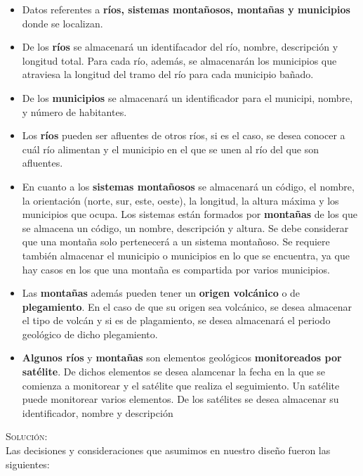 \documentclass[letterpaper,11pt]{article}
\begin{document}
\begin{itemize}
    \begin{itemize}
        \item Datos referentes a \textbf{ríos, sistemas montañosos, montañas y
              municipios} donde se localizan.
        \item De los \textbf{ríos} se almacenará un identifacador del río, nombre,
              descripción y longitud total. Para cada río, además, se almacenarán
              los municipios que atraviesa la longitud del tramo del río para cada
              municipio bañado.
        \item De los \textbf{municipios} se almacenará un identificador para
              el municipi, nombre, y número de habitantes.
        \item Los \textbf{ríos} pueden ser afluentes de otros ríos, si es el caso,
              se desea conocer a cuál río alimentan y el municipio en el que se unen
              al río del que son afluentes.
        \item En cuanto a los \textbf{sistemas montañosos} se almacenará un código,
              el nombre, la orientación (norte, sur, este, oeste), la longitud, la
              altura máxima y los municipios que ocupa. Los sistemas están formados
              por \textbf{montañas} de los que se almacena un código, un nombre,
              descripción y altura. Se debe considerar que una montaña solo
              pertenecerá a un sistema montañoso. Se requiere también almacenar
              el municipio o municipios en lo que se encuentra, ya que hay casos
              en los que una montaña es compartida por varios municipios.
        \item Las \textbf{montañas} además pueden tener un \textbf{origen volcánico}
              o de \textbf{plegamiento}. En el caso de que su origen sea volcánico,
              se desea almacenar el tipo de volcán y si es de plagamiento, se desea
              almacenará el periodo geológico de dicho plegamiento.
        \item \textbf{Algunos ríos} y \textbf{montañas} son elementos geológicos
              \textbf{monitoreados por satélite}. De dichos elementos se desea
              alamcenar la fecha en la que se comienza a monitorear y el satélite
              que realiza el seguimiento. Un satélite puede monitorear varios
              elementos. De los satélites se desea almacenar su identificador,
              nombre y descripción
    \end{itemize}

 \textsc{Solución:}\\
 Las decisiones y consideraciones que asumimos en nuestro diseño fueron 
las siguientes: 


\end{itemize}
\end{document}
